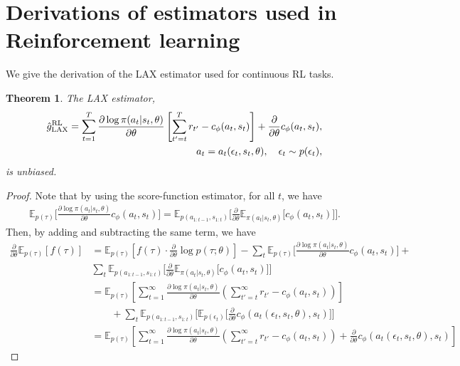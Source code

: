 \documentclass{article}
\newcommand{\E}{\mathbb{E}}
\newcommand{\LL}[1]{\frac{\partial \log \pi(a_{#1}| s_{#1}, \theta)}{\partial \theta}}
\newcommand{\PT}{\frac{\partial}{\partial \theta}}
\newcommand{\LP}[1]{\PT \log p(#1)}
\newcommand{\LAX}{{\textnormal{LAX}}}
\newcommand{\RL}{{\textnormal{RL}}}
\newtheorem{theorem}{Theorem}[section]
\begin{document}
\section{Derivations of estimators used in Reinforcement learning}
\label{rl appendix}
We give the derivation of the \LAX{} estimator used for continuous RL tasks.
\begin{theorem}
The \LAX{} estimator,
\begin{align}
\hat g_\LAX^{\RL} = \sum_{t=1}^{T} \LL{t} \left[ \sum_{t'=t}^{T} r_{t'} - c_\phi(a_t,s_t) \right] +\frac{\partial}{\partial\theta} c_\phi(a_t, s_t), \\
a_t = a_t(\epsilon_t,s_t,\theta), \quad \epsilon_t \sim p(\epsilon_t)\nonumber,
\end{align}
is unbiased.
\end{theorem}
\begin{proof}
Note that by using the score-function estimator, for all $t$, we have 
%
\begin{align*}
\E_{p(\tau)}\Big[\LL{t} c_\phi(a_t, s_t)\Big] = \E_{p(a_{1:t-1},s_{1:t})}\Big[\frac{\partial}{\partial\theta}\E_{\pi(a_t|s_t, \theta)}\Big[c_\phi(a_t, s_t)\Big]\Big].
\end{align*}
Then, by adding and subtracting the same term, we have
\begin{align*}
\PT\E_{p(\tau)}[f(\tau)] &= \E_{p(\tau)}\left[f(\tau)\cdot\LP{\tau;\theta}\right]-\sum_t\E_{p(\tau)}\Big[\LL{t} c_\phi(a_t, s_t)\Big]+\\&\sum_t \E_{p(a_{1:t-1},s_{1:t})}\Big[\frac{\partial}{\partial\theta}\E_{\pi(a_t|s_t, \theta)}\Big[c_\phi(a_t,s_t)\Big]\Big]\nonumber\\
&= \E_{p(\tau)}\left[ \sum_{t=1}^{\infty} \LL{t}\left(\sum_{t'=t}^{\infty} r_{t'} - c_\phi(a_t,s_t)\right)\right]\\
& \qquad + \sum_t \E_{p(a_{1:t-1},s_{1:t})}\Big[\E_{p(\epsilon_t)}\Big[\frac{\partial}{\partial\theta}c_\phi(a_t(\epsilon_t,s_t,\theta), s_t)\Big]\Big]\nonumber\\
&= \E_{p(\tau)}\left[ \sum_{t=1}^{\infty} \LL{t}\left(\sum_{t'=t}^{\infty} r_{t'} - c_\phi(a_t,s_t)\right)+\frac{\partial}{\partial\theta}c_\phi(a_t(\epsilon_t,s_t,\theta), s_t)\right]\nonumber
\end{align*}
\end{proof}
\end{document}
